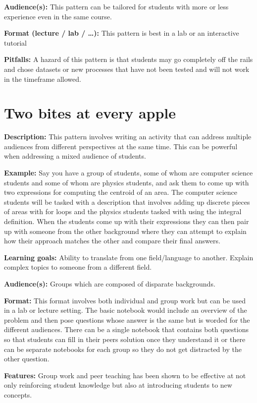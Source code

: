 \documentclass[]{book}
\begin{document}
\textbf{Audience(s):} This pattern can be tailored for students with
more or less experience even in the same course.

\textbf{Format (lecture / lab / \ldots{}):} This pattern is best in a
lab or an interactive tutorial

\textbf{Pitfalls:} A hazard of this pattern is that students may go
completely off the rails and chose datasets or new processes that have
not been tested and will not work in the timeframe allowed.

\section{Two bites at every apple}\label{two-bites-at-every-apple}

\textbf{Description:} This pattern involves writing an activity that can
address multiple audiences from different perspectives at the same time.
This can be powerful when addressing a mixed audience of students.

\textbf{Example:} Say you have a group of students, some of whom are
computer science students and some of whom are physics students, and ask
them to come up with two expressions for computing the centroid of an
area. The computer science students will be tasked with a description
that involves adding up discrete pieces of areas with for loops and the
physics students tasked with using the integral definition. When the
students come up with their expressions they can then pair up with
someone from the other background where they can attempt to explain how
their approach matches the other and compare their final answers.

\textbf{Learning goals:} Ability to translate from one field/language to
another. Explain complex topics to someone from a different field.

\textbf{Audience(s):} Groups which are composed of disparate
backgrounds.

\textbf{Format:} This format involves both individual and group work but
can be used in a lab or lecture setting. The basic notebook would
include an overview of the problem and then pose questions whose answer
is the same but is worded for the different audiences. There can be a
single notebook that contains both questions so that students can fill
in their peers solution once they understand it or there can be separate
notebooks for each group so they do not get distracted by the other
question.

\textbf{Features:} Group work and peer teaching has been shown to be
effective at not only reinforcing student knowledge but also at
introducing students to new concepts.
\end{document}
